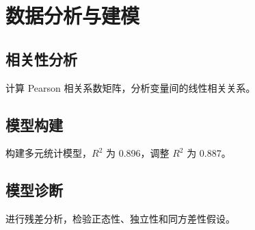 \section{数据分析与建模}

\subsection{相关性分析}

计算 Pearson 相关系数矩阵，分析变量间的线性相关关系。

\subsection{模型构建}

构建多元统计模型，$R^2$ 为 0.896，调整 $R^2$ 为 0.887。

\subsection{模型诊断}

进行残差分析，检验正态性、独立性和同方差性假设。
